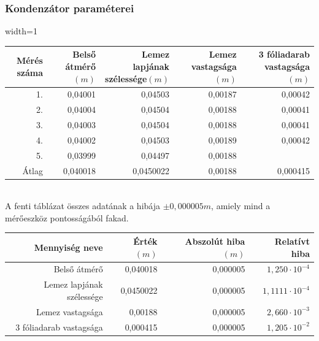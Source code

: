 \documentclass[10pt,pdftex]{report}
\begin{document}
\subsubsection*{Kondenzátor paraméterei}
\begin{centering}
\centering
\begin{adjustbox}{width=1\textwidth}
\begin{tabular}{|r|r|r|r|r|}
    \hline
    Mérés száma & Belső átmérő$(m)$ & Lemez lapjának szélessége$(m)$ & Lemez vastagsága$(m)$ & 3 fóliadarab vastagsága$(m)$ \\
    \hline
    1. & 0,04001 & 0,04503 & 0,00187 & 0,00042\\
    \hline
    2. & 0,04004 & 0,04504 & 0,00188 & 0,00041\\
    \hline
    3. & 0,04003 & 0,04504 & 0,00188 & 0,00041\\
    \hline
    4. & 0,04002 & 0,04503 & 0,00189 & 0,00042\\
    \hline
    5. & 0,03999 & 0,04497 & 0,00188 & \\
    \hline
    Átlag & 0,040018 & 0,0450022 & 0,00188 & 0,000415 \\
    \hline
\end{tabular}
\end{adjustbox}
\end{centering}\\
\newline
A fenti táblázat összes adatának a hibája $\pm0,000005m$, amiely mind a mérőeszköz pontosságából fakad.
\newline
\newline
\newline
\begin{centering}
    \centering
    \begin{tabular}{|r|r|r|r|}
        \hline
        Mennyiség neve & Érték$(m)$ & Abszolút hiba$(m)$ & Relatívt hiba\\
        \hline
        Belső átmérő & 0,040018 & 0,000005 & $1,250\cdot 10^{-4}$\\
        \hline
        Lemez lapjának szélessége & 0,0450022 & 0,000005 & $1,1111\cdot 10^{-4}$\\
        \hline
        Lemez vastagsága & 0,00188 & 0,000005 & $2,660\cdot 10^{-3}$\\
        \hline
        3 fóliadarab vastagsága & 0,000415 & 0,000005 & $1,205\cdot 10^{-2}$ \\
        \hline
    \end{tabular}
    \end{centering}
\end{document}
